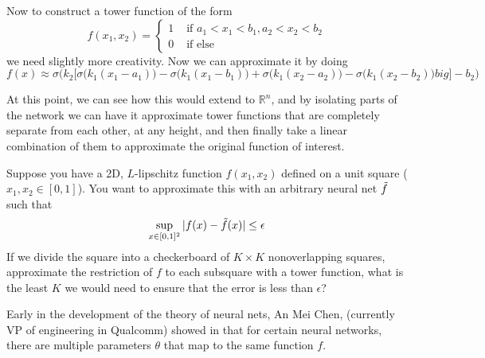   \begin{example} 
    Now to construct a tower function of the form 
    \begin{equation}
      f(x_1, x_2) = \begin{cases} 1 & \text{ if } a_1 < x_1 < b_1, a_2 < x_2 < b_2 \\ 0 & \text{ if else} \end{cases}
    \end{equation}
    we need slightly more creativity. Now we can approximate it by doing 
    \begin{equation}
      f(x) \approx \sigma \bigg( k_2 \big[ \sigma\big( k_1 (x_1 - a_1)\big) - \sigma\big( k_1 (x_1 -b_1)\big) + \sigma \big( k_1 (x_2 - a_2)\big) - \sigma\big(k_1 (x_2 - b_2)\big)  big] - b_2\bigg)
    \end{equation}
  \end{example} 

  At this point, we can see how this would extend to $\mathbb{R}^n$, and by isolating parts of the network we can have it approximate tower functions that are completely separate from each other, at any height, and then finally take a linear combination of them to approximate the original function of interest.  

  \begin{theorem}[CS671 Fall 2023 PS5]
    Suppose you have a 2D, $L$-lipschitz function $f(x_1, x_2)$ defined on a unit square ($x_1, x_2 \in \left [0,1 \right ]$). You want to approximate this with an arbitrary neural net $\Tilde{f}$ such that
    \begin{equation}
      \sup_{x \in [0, 1]^2} |f(x) - \Tilde{f}(x)| \leq \epsilon
    \end{equation}
    If we divide the square into a checkerboard of $K \times K$ nonoverlapping squares, approximate the restriction of $f$ to each subsquare with a tower function, what is the least $K$ we would need to ensure that the error is less than $\epsilon$? 
  \end{theorem} 

  Early in the development of the theory of neural nets, An Mei Chen, (currently VP of engineering in Qualcomm) showed in \cite{symmetry} that for certain neural networks, there are multiple parameters $\theta$ that map to the same function $f$. 

